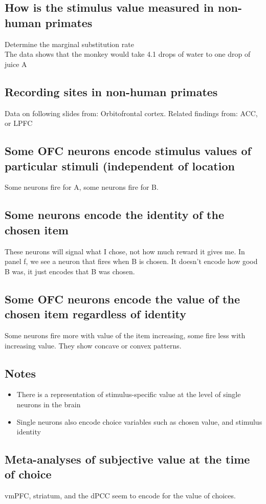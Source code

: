 \subsection{How is the stimulus value measured in non-human primates}
Determine the marginal substitution rate
\\The data shows that the monkey would take 4.1 drops of water to one drop of juice A

\subsection{Recording sites in non-human primates}
Data on following slides from: Orbitofrontal cortex. Related findings from: ACC, or LPFC
\subsection{Some OFC neurons encode stimulus values of particular stimuli (independent of location}
Some neurons fire for A, some neurons fire for B. 

\subsection{Some neurons encode the identity of the chosen item}
These neurons will signal what I chose, not how much reward it gives me. In panel f, we see a neuron that fires when B is chosen. It doesn't encode how good B was, it just encodes that B was chosen.

\subsection{Some OFC neurons encode the value of the chosen item regardless of identity}
Some neurons fire more with value of the item increasing, some fire less with increasing value.
They show concave or convex patterns.

\subsection{Notes}
\begin{itemize}
    \item There is a representation of stimulus-specific value at the level of single neurons in the brain
    \item Single neurons also encode choice variables such as chosen value, and stimulus identity
\end{itemize}

\subsection{Meta-analyses of subjective value at the time of choice}
vmPFC, striatum, and the dPCC seem to encode for the value of choices.


